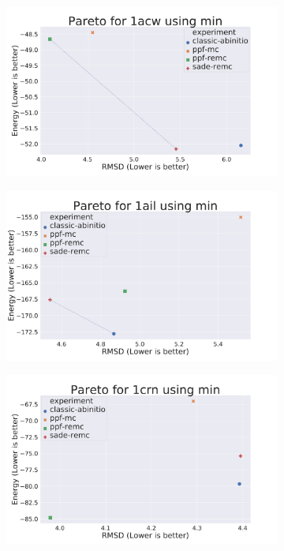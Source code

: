 \begin{figure}
  \begin{subfigure}{0.49\linewidth}
    \includegraphics[width=1\linewidth]{Figuras/pareto/1acw_best_by_rmsd_min.pdf}
  \end{subfigure}
%
  \begin{subfigure}{0.49\linewidth}
    \includegraphics[width=1\linewidth]{Figuras/pareto/1ail_best_by_rmsd_min.pdf}
  \end{subfigure}
%
  \begin{subfigure}{0.49\linewidth}
    \includegraphics[width=1\linewidth]{Figuras/pareto/1crn_best_by_rmsd_min.pdf}

\end{subfigure}
\end{figure}
